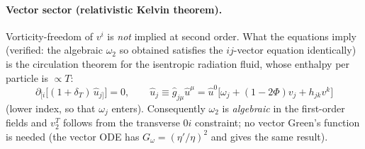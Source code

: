 \paragraph{Vector sector (relativistic Kelvin theorem).}
Vorticity-freedom of $v^i$ is \emph{not} implied at second order.  What the equations imply (verified: the
algebraic $\omega_2$ so obtained satisfies the $ij$-vector equation identically) is the circulation theorem
for the isentropic radiation fluid, whose enthalpy per particle is $\propto T$:
\begin{equation}
\partial_{[i}\big[(1+\delta_T)\,\hat u_{j]}\big]=0,\qquad
\hat u_j\equiv\hat g_{j\mu}\hat u^\mu=\hat u^0\big[\omega_j+(1-2\Phi)v_j+h_{jk}v^k\big]
\label{eq:kelvin}
\end{equation}
(lower index, so that $\omega_j$ enters).
Consequently $\omega_2$ is \emph{algebraic} in the first-order fields and $v^T_2$ follows from the transverse
$0i$ constraint; no vector Green's function is needed (the vector ODE has $G_\omega=(\eta'/\eta)^2$ and gives the
same result).

